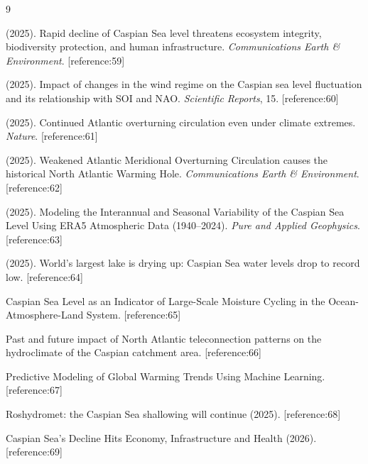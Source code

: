 \documentclass[12pt,letterpaper]{article}
\begin{document}
\begin{thebibliography}{9}

 (2025). Rapid decline of Caspian Sea level threatens ecosystem integrity, biodiversity protection, and human infrastructure. \emph{Communications Earth \& Environment}. [reference:59]

 (2025). Impact of changes in the wind regime on the Caspian sea level fluctuation and its relationship with SOI and NAO. \emph{Scientific Reports}, 15. [reference:60]

 (2025). Continued Atlantic overturning circulation even under climate extremes. \emph{Nature}. [reference:61]

 (2025). Weakened Atlantic Meridional Overturning Circulation causes the historical North Atlantic Warming Hole. \emph{Communications Earth \& Environment}. [reference:62]

 (2025). Modeling the Interannual and Seasonal Variability of the Caspian Sea Level Using ERA5 Atmospheric Data (1940–2024). \emph{Pure and Applied Geophysics}. [reference:63]

 (2025). World’s largest lake is drying up: Caspian Sea water levels drop to record low. [reference:64]

 Caspian Sea Level as an Indicator of Large-Scale Moisture Cycling in the Ocean-Atmosphere-Land System. [reference:65]

 Past and future impact of North Atlantic teleconnection patterns on the hydroclimate of the Caspian catchment area. [reference:66]

 Predictive Modeling of Global Warming Trends Using Machine Learning. [reference:67]

 Roshydromet: the Caspian Sea shallowing will continue (2025). [reference:68]

 Caspian Sea’s Decline Hits Economy, Infrastructure and Health (2026). [reference:69]

\end{thebibliography}
\end{document}
